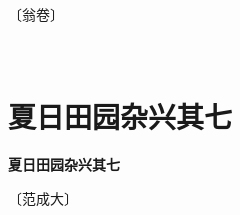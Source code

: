 \documentclass[12pt,UTF-8,openany,fontset=none]{ctexbook}
\begin{document}
\begin{center}
    \vspace{10pt}
    
    \begin{large}
        
        〔翁卷〕
        
    \end{large}
    
    \vspace{8pt}
    
    \begin{huge}
        
        \phantom{。}

        \phantom{。}
        
        \phantom{。}

        \phantom{。}~~
        
    \end{huge}
    
\end{center}

\vspace{8pt}
\clearpage

\section{夏日田园杂兴其七}



\begin{center}
    {\bfseries 夏日田园杂兴其七}
\end{center}

\begin{center}
    \vspace{10pt}
    
    \begin{large}
        
        〔范成大〕
        
    \end{large}
    
    \vspace{8pt}
    
    \begin{huge}
        
        \phantom{。}

        \phantom{。}
        
        \phantom{。}

        \phantom{。}~~
        
    \end{huge}
    
\end{center}
\end{document}
